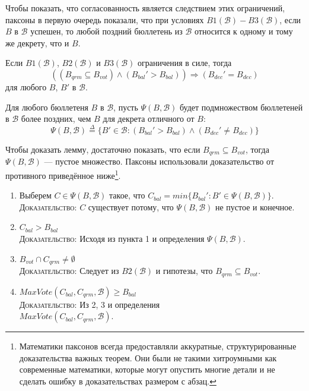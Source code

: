 \documentclass[12pt, a4paper]{article} %
\begin{document}
Чтобы показать, что согласованность является следствием этих ограничений, паксоны в первую очередь показали, что при условиях $B1(\mathcal{B}) - B3(\mathcal{B})$, если $B$ в $\mathcal{B}$ успешен, то любой поздний бюллетень из $\mathcal{B}$ относится к одному и тому же декрету, что и $B$.

\begin{lemma}
Если $B1(\mathcal{B})$, $B2(\mathcal{B})$ и $B3(\mathcal{B})$ ограничения в силе, тогда
\[
    ((B_{qrm} \subseteq B_{vot}) \land (B_{bal}' > B_{bal})) \Rightarrow (B_{dec}' = B_{dec})
\]
для любого $B$, $B'$ в $\mathcal{B}$.
\end{lemma}
\begin{lemmaproof}
Для любого бюллетеня $B$ в $\mathcal{B}$, пусть $\Psi(B, \mathcal{B})$ будет подмножеством бюллетеней в $\mathcal{B}$ более поздних, чем $B$ для декрета отличного от $B$:
\[
    \Psi(B, \mathcal{B}) \overset{\Delta}{=} \{B' \in \mathcal{B} : (B_{bal}' > B_{bal}) \land (B_{dec}' \neq B_{dec})\}
\]

Чтобы доказать лемму, достаточно показать, что если $B_{qrm} \subseteq B_{vot}$, тогда $\Psi(B, \mathcal{B})$ --- пустое множество. Паксоны использовали доказательство от противного приведённое ниже\footnote{Математики паксонов всегда предоставляли аккуратные, структурированные доказательства важных теорем. Они были не такими хитроумными как современные математики, которые могут опустить многие детали и не сделать ошибку в доказательствах размером с абзац.}.
\begin{enumerate}
    \item Выберем $C \in \Psi(B, \mathcal{B})$ такое, что $C_{bal} = min \{B_{bal}' : B' \in \Psi(B, \mathcal{B})\}$. \\
          \textsc{Доказательство}: $C$ существует потому, что $\Psi(B, \mathcal{B})$ не пустое и конечное.
    
    \item $C_{bal} > B_{bal}$\\
          \textsc{Доказательство}: Исходя из пункта 1 и определения $\Psi(B, \mathcal{B})$.

    \item $B_{vot} \cap C_{qrm} \neq \emptyset$\\
          \textsc{Доказательство}: Следует из  $B2(\mathcal{B})$ и гипотезы, что $B_{qrm} \subseteq B_{vot}$.
    
    \item $MaxVote(C_{bal}, C_{qrm}, \mathcal{B}) \geqslant B_{bal}$\\
          \textsc{Доказательство}: Из 2, 3 и определения\\
           $MaxVote(C_{bal}, C_{qrm}, \mathcal{B})$.


\end{enumerate}
\end{lemmaproof}
\end{document}
